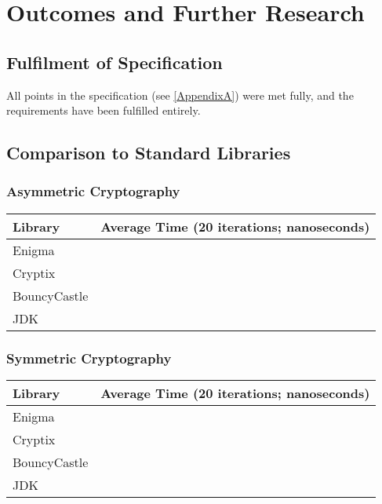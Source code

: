 
\chapter{Outcomes and Further Research} 
\label{Chapter8}

\section{Fulfilment of Specification}

All points in the specification (see \textsection\ref{AppendixA}) were met fully, and the requirements have been fulfilled entirely.

\section{Comparison to Standard Libraries}

  \subsection{Asymmetric Cryptography}
  
    \begin{center}
      \begin{tabular}{ | l | l |}
        \hline
        Library & Average Time (20 iterations; nanoseconds) \\ \hline \hline
        Enigma &  \\ \hline
        Cryptix &  \\ \hline
        BouncyCastle & \\ \hline
        JDK & \\ \hline
        \hline
      \end{tabular}
    \end{center}
  
  \subsection{Symmetric Cryptography}
  
    \begin{center}
      \begin{tabular}{ | l | l |}
        \hline
        Library & Average Time (20 iterations; nanoseconds) \\ \hline \hline
        Enigma &  \\ \hline
        Cryptix &  \\ \hline
        BouncyCastle & \\ \hline
        JDK & \\ \hline
        \hline
      \end{tabular}
    \end{center}

